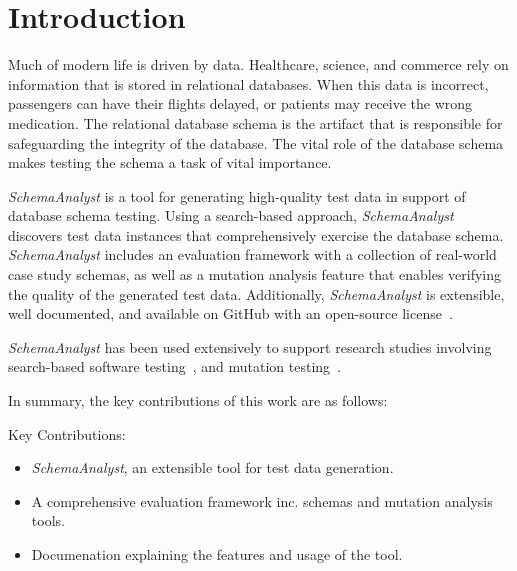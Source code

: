 \section{Introduction}

Much of modern life is driven by data.  Healthcare, science, and commerce rely on information that is
stored in relational databases.  When this data is incorrect, passengers can have their flights
delayed, or patients may receive the wrong medication. The relational database schema is the artifact
that is responsible for safeguarding the integrity of the database. The vital role of the database
schema makes testing the schema a task of vital importance.

\textit{SchemaAnalyst} is a tool for generating high-quality test data in support of database schema
testing. Using a search-based approach, \textit{SchemaAnalyst} discovers test data instances that
comprehensively exercise the database schema. \textit{SchemaAnalyst} includes an evaluation framework
with a collection of real-world case study schemas, as well as a mutation analysis feature
that enables verifying the quality of the generated test data. Additionally, \textit{SchemaAnalyst}
is extensible, well documented, and available on GitHub with an open-source license~\cite{tool}.

\textit{SchemaAnalyst} has been used extensively to support research studies involving search-based
software testing~\cite{kapfhammer2013search,mcminn2015effectiveness,kinneer2015automatically}, and
mutation testing~\cite{wright2013efficient,wright2014impact,wright2015mutation}.

In summary, the key contributions of this work are as follows:

Key Contributions:
\begin{itemize}
\item \textit{SchemaAnalyst}, an extensible tool for test data generation.
\item A comprehensive evaluation framework inc. schemas and mutation analysis tools.
\item Documenation explaining the features and usage of the tool.
\end{itemize}
